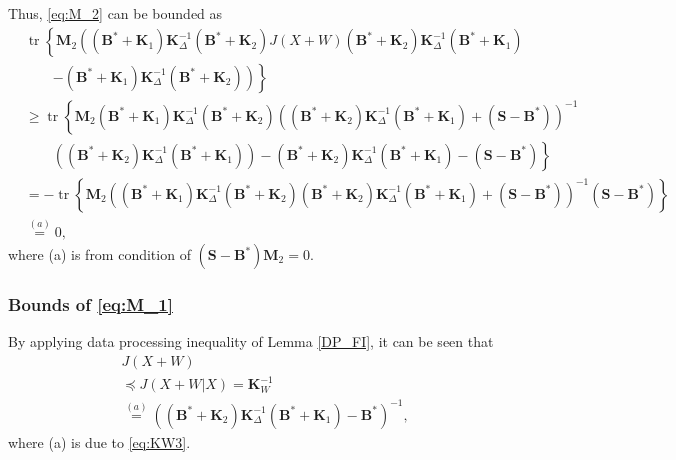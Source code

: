 \documentclass[journal,final, onecolumn]{IEEEtran}
\DeclareMathOperator{\tr}{tr}
\begin{document}
Thus, \eqref{eq:M_2} can be bounded as
\begin{align}
&\tr \left\{  \boldsymbol{M}_{2} \left(      (\boldsymbol{B}^{*} + \boldsymbol{K}_{1}) \boldsymbol{K}^{-1}_{\Delta}(\boldsymbol{B}^{*} + \boldsymbol{K}_{2}) J(X+W)(\boldsymbol{B}^{*} + \boldsymbol{K}_{2}) \boldsymbol{K}^{-1}_{\Delta}(\boldsymbol{B}^{*} + \boldsymbol{K}_{1}) \right.\right.\nonumber \\
& \qquad \left.\left.  -(\boldsymbol{B}^{*} + \boldsymbol{K}_{1}) \boldsymbol{K}^{-1}_{\Delta}(\boldsymbol{B}^{*} + \boldsymbol{K}_{2})     \right)         \right\} \\
& \geq \tr \left\{    \boldsymbol{M}_{2}   (\boldsymbol{B}^{*} + \boldsymbol{K}_{1}) \boldsymbol{K}^{-1}_{\Delta}(\boldsymbol{B}^{*} + \boldsymbol{K}_{2})  \left(   (\boldsymbol{B}^{*} + \boldsymbol{K}_{2}) \boldsymbol{K}^{-1}_{\Delta}(\boldsymbol{B}^{*} + \boldsymbol{K}_{1}) +(\boldsymbol{S}- \boldsymbol{B}^{*})\right)^{-1} \right.\nonumber \\
& \quad \quad \left.\left( (\boldsymbol{B}^{*} + \boldsymbol{K}_{2}) \boldsymbol{K}^{-1}_{\Delta}(\boldsymbol{B}^{*} + \boldsymbol{K}_{1})      \right) -(\boldsymbol{B}^{*} + \boldsymbol{K}_{2}) \boldsymbol{K}^{-1}_{\Delta}(\boldsymbol{B}^{*} + \boldsymbol{K}_{1}) -\left(\boldsymbol{S}- \boldsymbol{B}^{*}\right)         \right\} \\
&= -\tr \left\{    \boldsymbol{M}_{2} \left(   (\boldsymbol{B}^{*} + \boldsymbol{K}_{1}) \boldsymbol{K}^{-1}_{\Delta}(\boldsymbol{B}^{*} + \boldsymbol{K}_{2})    (\boldsymbol{B}^{*} + \boldsymbol{K}_{2}) \boldsymbol{K}^{-1}_{\Delta}(\boldsymbol{B}^{*} + \boldsymbol{K}_{1}) +(\boldsymbol{S}- \boldsymbol{B}^{*})\right)^{-1}  \left(\boldsymbol{S}- \boldsymbol{B}^{*}\right)         \right\}\\
&\overset{(a)}= 0,\label{eq:01}
\end{align}
where (a) is from condition of $\left(\boldsymbol{S} - \boldsymbol{B}^{*} \right) \boldsymbol{M}_2 =0$.


\subsubsection{Bounds of \eqref{eq:M_1}}
By applying data processing inequality of Lemma \ref{DP_FI}, it can be seen that
\begin{align}
&J(X+W) \nonumber \\
&\preceq J(X+W|X)= \boldsymbol{K}^{-1}_{W} \\
&\overset{(a)}= \left((\boldsymbol{B}^{*} + \boldsymbol{K}_{2}) \boldsymbol{K}^{-1}_{\Delta}(\boldsymbol{B}^{*} + \boldsymbol{K}_{1}) - \boldsymbol{B}^{*}\right)^{-1},
\end{align}
where (a) is due to \eqref{eq:KW3}.
\end{document}
